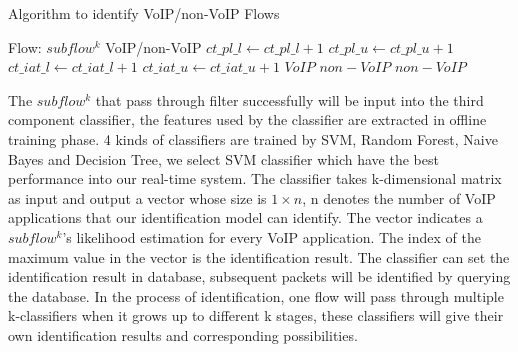 \documentclass[conference]{IEEEtran}
\begin{document}
\renewcommand{\algorithmicrequire}{\textbf{Input:}}
\renewcommand{\algorithmicensure}{\textbf{Output:}}

\begin{algorithm}[!h]
\caption{Algorithm to identify VoIP/non-VoIP Flows}
\label{algorithm:filter}
\begin{algorithmic}[1]
\REQUIRE Flow: $subflow^k$
\ENSURE VoIP/non-VoIP
       	\STATE $ct\_pl\_l \gets ct\_pl\_l +1$
       \ENDIF
       	\STATE $ct\_pl\_u \gets ct\_pl\_u+1$
       \ENDIF
       	\STATE $ct\_iat\_l  \gets ct\_iat\_l+1$
       \ENDIF
       	\STATE $ct\_iat\_u \gets ct\_iat\_u+1$
       \ENDIF
    \ENDFOR
        \RETURN $VoIP$
    \ELSE  \RETURN $non-VoIP$
   \ENDIF
\ELSE \RETURN $non-VoIP$
\ENDIF
\end{algorithmic}
\end{algorithm}

The $subflow^k$ that pass through filter successfully will be input into the third component classifier, the features used by the classifier are extracted in offline training phase. 4 kinds of classifiers are trained by SVM, Random Forest, Naive Bayes and Decision Tree, we select SVM classifier which have the best performance into our real-time system. The classifier takes k-dimensional matrix as input and output a vector whose size is $1 \times n$,  n denotes the number of VoIP applications that our identification model can identify. The vector indicates a $subflow^k$'s likelihood estimation for every VoIP application. The index of the maximum value in the vector is the identification result. The classifier can set the identification result in database, subsequent packets will be identified by querying the database. In the process of identification, one flow will pass through multiple k-classifiers when it grows up to different k stages, these classifiers will give their own identification results and corresponding possibilities.
\end{document}
